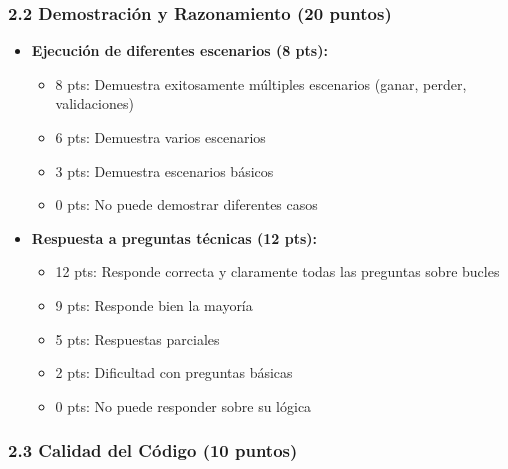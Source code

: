 \documentclass[12pt,a4paper]{article}
\begin{document}
\subsubsection{2.2 Demostración y Razonamiento (20 puntos)}

\begin{itemize}[leftmargin=*]
    \item \textbf{Ejecución de diferentes escenarios (8 pts):}
    \begin{itemize}
        \item 8 pts: Demuestra exitosamente múltiples escenarios (ganar, perder, validaciones)
        \item 6 pts: Demuestra varios escenarios
        \item 3 pts: Demuestra escenarios básicos
        \item 0 pts: No puede demostrar diferentes casos
    \end{itemize}
    
    \item \textbf{Respuesta a preguntas técnicas (12 pts):}
    \begin{itemize}
        \item 12 pts: Responde correcta y claramente todas las preguntas sobre bucles
        \item 9 pts: Responde bien la mayoría
        \item 5 pts: Respuestas parciales
        \item 2 pts: Dificultad con preguntas básicas
        \item 0 pts: No puede responder sobre su lógica
    \end{itemize}
\end{itemize}

\subsubsection{2.3 Calidad del Código (10 puntos)}
\end{document}
